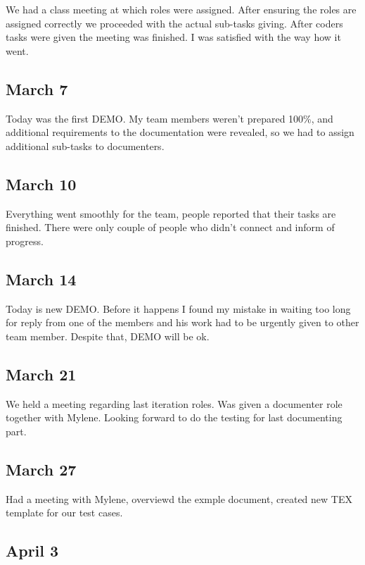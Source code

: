 \documentclass[11pt,letterpaper]{article}
\begin{document}
We had a class meeting at which roles were assigned. After ensuring the roles are assigned correctly we proceeded with the actual sub-tasks giving. After coders tasks were given the meeting was finished. I was satisfied with the way how it went.

\subsection*{March 7}

Today was the first DEMO. My team members weren't prepared 100\%, and additional requirements to the documentation were revealed, so we had to assign additional sub-tasks to documenters.

\subsection*{March 10}

Everything went smoothly for the team, people reported that their tasks are finished. There were only couple of people who didn't connect and inform of progress.

\subsection*{March 14}

Today is new DEMO. Before it happens I found my mistake in waiting too long for reply from one of the members and his work had to be urgently given to other team member. Despite that, DEMO will be ok.

\subsection*{March 21}

We held a meeting regarding last iteration roles. Was given a documenter role together with Mylene. Looking forward to do the testing for last documenting part.

\subsection*{March 27}

Had a meeting with Mylene, overviewd the exmple document, created new TEX template for our test cases.

\subsection*{April 3}
\end{document}
